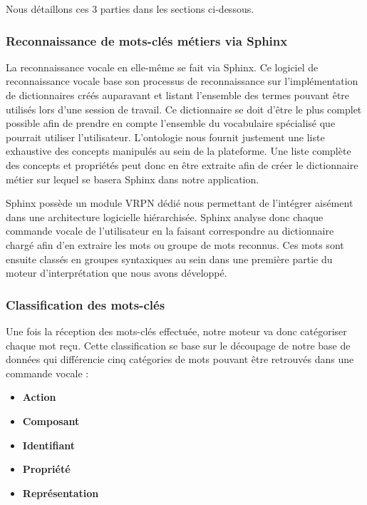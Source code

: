 Nous détaillons ces 3 parties dans les sections ci-dessous.

\subsubsection{Reconnaissance de mots-clés métiers via Sphinx} \label{Sphinx}

La reconnaissance vocale en elle-même se fait via Sphinx. Ce logiciel de reconnaissance vocale base son processus de reconnaissance sur l'implémentation de dictionnaires créés auparavant et listant l'ensemble des termes pouvant être utilisés lors d'une session de travail. 
Ce dictionnaire se doit d'être le plus complet possible afin de prendre en compte l'ensemble du vocabulaire spécialisé que pourrait utiliser l'utilisateur. L'ontologie nous fournit justement une liste exhaustive des concepts manipulés au sein de la plateforme. Une liste complète des concepts et propriétés peut donc en être extraite afin de créer le dictionnaire métier sur lequel se basera Sphinx dans notre application.

Sphinx possède un module VRPN dédié nous permettant de l'intégrer aisément dans une architecture logicielle hiérarchisée. Sphinx analyse donc chaque commande vocale de l'utilisateur en la faisant correspondre au dictionnaire chargé afin d'en extraire les mots ou groupe de mots reconnus. Ces mots sont ensuite classés en groupes syntaxiques au sein dans une première partie du moteur d'interprétation que nous avons développé.

\subsubsection{Classification des mots-clés} \label{classification_keywords}

Une fois la réception des mots-clés effectuée, notre moteur va donc catégoriser chaque mot reçu. Cette classification se base sur le découpage de notre base de données qui différencie cinq catégories de mots pouvant être retrouvés dans une commande vocale :

\begin{itemize}
	\item \textbf{Action}
	\item \textbf{Composant}
	\item \textbf{Identifiant}
	\item \textbf{Propriété}
	\item \textbf{Représentation}
\end{itemize}

